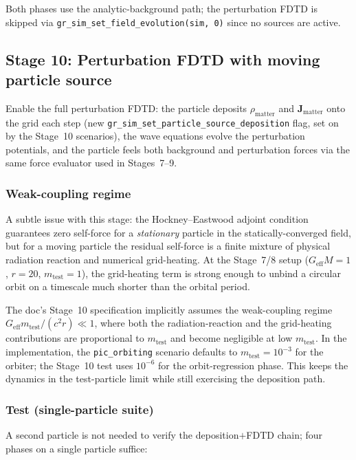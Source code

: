 \documentclass[11pt,a4paper]{article}
\newcommand{\vv}[1]{\mathbf{#1}}
\begin{document}
Both phases use the analytic-background path; the perturbation FDTD is
skipped via \texttt{gr\_sim\_set\_field\_evolution(sim,~0)} since no
sources are active.

\subsection{Stage 10: Perturbation FDTD with moving particle source}
\label{sec:stage_perturb_fdtd}

Enable the full perturbation FDTD: the particle deposits $\rho_{\mathrm{matter}}$ and $\vv{J}_{\mathrm{matter}}$ onto the grid each step (new \texttt{gr\_sim\_set\_particle\_source\_deposition} flag, set on by the Stage~10 scenarios), the wave equations evolve the perturbation potentials, and the particle feels both background and perturbation forces via the same force evaluator used in Stages~7--9.

\subsubsection*{Weak-coupling regime}

A subtle issue with this stage: the Hockney--Eastwood adjoint condition
guarantees zero self-force for a \emph{stationary} particle in the
statically-converged field, but for a moving particle the residual
self-force is a finite mixture of physical radiation reaction and
numerical grid-heating.  At the Stage~7/8 setup ($G_{\mathrm{eff}} M = 1$,
$r = 20$, $m_{\mathrm{test}} = 1$), the grid-heating term is strong enough
to unbind a circular orbit on a timescale much shorter than the orbital
period.

The doc's Stage~10 specification implicitly assumes the weak-coupling
regime $G_{\mathrm{eff}} m_{\mathrm{test}} / (c^2 r) \ll 1$, where both
the radiation-reaction and the grid-heating contributions are
proportional to $m_{\mathrm{test}}$ and become negligible at low
$m_{\mathrm{test}}$.  In the implementation, the
\texttt{pic\_orbiting} scenario defaults to
$m_{\mathrm{test}} = 10^{-3}$ for the orbiter; the Stage~10 test uses
$10^{-6}$ for the orbit-regression phase.  This keeps the dynamics in
the test-particle limit while still exercising the deposition path.

\subsubsection*{Test (single-particle suite)}

A second particle is not needed to verify the deposition$+$FDTD chain;
four phases on a single particle suffice:
\end{document}
